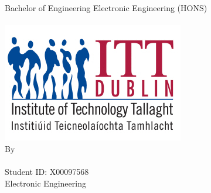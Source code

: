 \begin{center}
	\makeatletter
	{\huge Bachelor of Engineering Electronic Engineering (HONS)}\\[2cm] 
	{\Huge \@title}\\[3cm] 
	\includegraphics [scale =2]{../Photo/itt-logo} \\[2cm]   
	{\Huge By} \\[1cm] 
	{\LARGE \@author}\\[1cm] 
	{\large Student ID: X00097568}\\[1cm]  
	{\LARGE Electronic Engineering}\\[2cm] 
\end{center}



 
